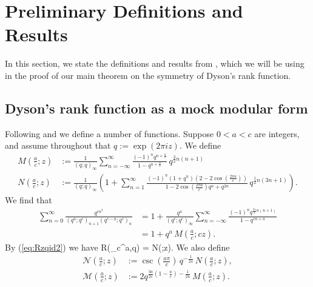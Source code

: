 \documentclass[12pt]{amsart}
\theoremstyle{definition}
\theoremstyle{remark}
\numberwithin{equation}{section}
\newcommand\Mac[3]{M\left(\frac{#1}{#2};#3\right)}
\newcommand\Nac[3]{N\left(\frac{#1}{#2};#3\right)}
\newcommand\Lpar[1]{\left(#1\right)}
\newcommand\Mell[3]{\mathcal{M}\left(\frac{#1}{#2};#3\right)}
\newcommand\Nell[3]{\mathcal{N}\left(\frac{#1}{#2};#3\right)}
\newcommand\eqn[1]{(\ref{eq:#1})}
\begin{document}


\section{Preliminary Definitions and Results}

In this section, we state the definitions and results from \cite{Ga19a}, which we will be using in the proof of our main theorem on the symmetry of Dyson's rank function.

\subsection{Dyson's rank function as a mock modular form}
Following \cite{Br-On10} and \cite{Ga19a} we define a number of functions.
Suppose $0 < a < c$ are integers, and assume throughout that $q:=\exp(2\pi iz)$.
We define
\begin{align*}
\Mac{a}{c}{z} &:= \frac{1}{(q;q)_\infty} \sum_{n=-\infty}^\infty 
                  \frac{(-1)^n q^{n+\frac{a}{c}}}
                       {1-q^{n+\frac{a}{c}}} \, q^{\frac{3}{2}n(n+1)}
\\
\Nac{a}{c}{z} &:= \frac{1}{(q;q)_\infty} \Lpar{1 + \sum_{n=1}^\infty 
                  \frac{(-1)^n (1 + q^n)\left(2 - 2\cos\left(\frac{2\pi a}{c}\right)\right)}
                       {1 - 2\cos\left(\frac{2\pi a}{c}\right)q^n + q^{2n}} 
                        \, q^{\frac{1}{2}n(3n+1)}}.
\end{align*}
We find
that
\begin{align}
\sum_{n=0}^\infty \frac{q^{cn^2}}{(q^a;q^c)_{n+1} (q^{c-a};q^c)_n}
&= 1 + \frac{q^a}{(q^c;q^c)_\infty} 
\sum_{n=-\infty}^\infty \frac{(-1)^n q^{\frac{3c}{2}n(n+1)}}{1-q^{cn+a}}
\label{eq:Macid}\\
&= 1 + q^a \, \Mac{a}{c}{cz}.
\nonumber
\end{align}
By \eqn{Rzqid2} we have
\beq
R(\zeta_c^a,q) = \Nac{a}{c}{z}.
\label{eq:RNacid}
\eeq
We also define
\begin{align}
\Nell{a}{c}{z} &:=\csc\Lpar{\frac{a\pi}{c}}\, q^{-\frac{1}{24}}\,\Nac{a}{c}{z},
\label{eq:Ndef}\\
\Mell{a}{c}{z} &:=2 q^{\frac{3a}{2c}\left(1-\frac{a}{c}\right) - \frac{1}{24}} \, \Mac{a}{c}{z}.
\label{eq:Mdef}
\end{align}
\end{document}
